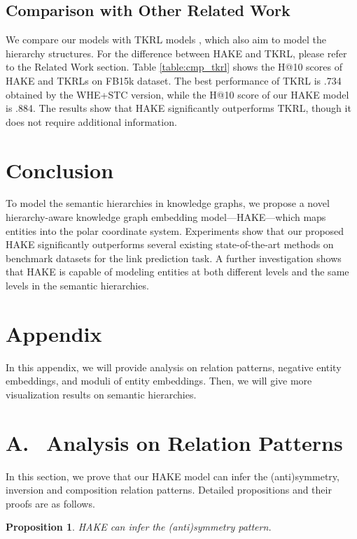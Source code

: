 \documentclass[letterpaper]{article} \usepackage{aaai20}  \usepackage{times}  \usepackage{helvet} \usepackage{courier}  \usepackage[hyphens]{url}  \usepackage{graphicx} \urlstyle{rm} \def\UrlFont{\rm}  \usepackage{graphicx}  \frenchspacing  \setlength{\pdfpagewidth}{8.5in}  \setlength{\pdfpageheight}{11in}
\newcommand{\citep}{\cite}
\newtheorem{prop}{Proposition}
\begin{document}
\subsection{Comparison with Other Related Work}
We compare our models with TKRL models \citep{hType}, which also aim to model the hierarchy structures. For the difference between HAKE and TKRL, please refer to the Related Work section.  Table \ref{table:cmp_tkrl} shows the H@10 scores of HAKE and TKRLs on FB15k dataset. The best performance of TKRL is .734 obtained by the WHE+STC version, while the H@10 score of our HAKE model is .884. The results show that HAKE significantly outperforms TKRL, though it does not require additional information.

\section{Conclusion}
To model the semantic hierarchies in knowledge graphs, we propose a novel hierarchy-aware knowledge graph embedding model---HAKE---which maps entities into the polar coordinate system. Experiments show that our proposed HAKE significantly outperforms several existing state-of-the-art methods on benchmark datasets for the link prediction task. A further investigation shows that HAKE is capable of modeling entities at both different levels and the same levels in the semantic hierarchies.




\newpage
\section*{Appendix}
In this appendix, we will provide analysis on relation patterns, negative entity embeddings, and moduli of entity embeddings. Then, we will give more visualization results on semantic hierarchies.

\section*{A.\,\,\, Analysis on Relation Patterns}
In this section, we prove that our HAKE model can infer the (anti)symmetry, inversion and composition relation patterns. Detailed propositions and their proofs are as follows.

\begin{prop}
    HAKE can infer the (anti)symmetry pattern.
\end{prop}
\end{document}
